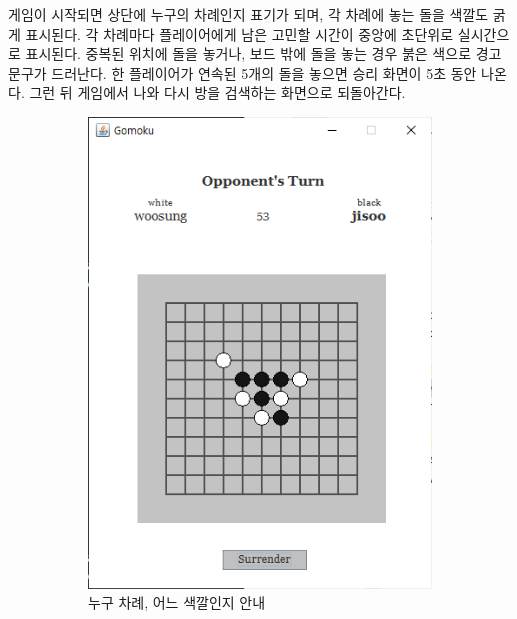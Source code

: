 \documentclass[a4paper, 10pt]{article}
\begin{document}
게임이 시작되면 상단에 누구의 차례인지 표기가 되며, 각 차례에 놓는 돌을
색깔도 굵게 표시된다. 각 차례마다 플레이어에게 남은 고민할 시간이 중앙에
초단위로 실시간으로 표시된다. 중복된 위치에 돌을 놓거나, 보드 밖에 돌을
놓는 경우 붉은 색으로 경고 문구가 드러난다. 한 플레이어가 연속된 5개의
돌을 놓으면 승리 화면이 5초 동안 나온다. 그런 뒤 게임에서 나와 다시 방을 검색하는
화면으로 되돌아간다.
\begin{figure}[h]
  \centering
  \begin{subfigure}{.3\textwidth}
    \centering
    \includegraphics[width=.9\linewidth]{resource/game}
    \caption{누구 차례, 어느 색깔인지 안내}
    \label{fig:waiting}
  \end{subfigure}
  \begin{subfigure}{.3\textwidth}
    \centering

\end{subfigure}
\end{figure}
\end{document}
